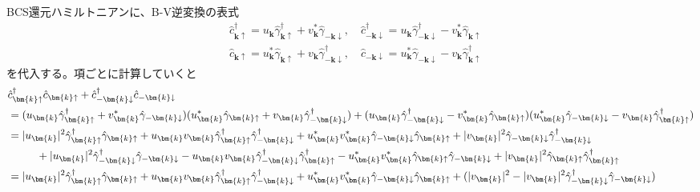 \documentclass[dvipdfmx, 11pt, a4paper]{jsarticle}
\numberwithin{equation}{section}
\theoremstyle{definition}
\begin{document}
    \begin{derivationBox}
        BCS還元ハミルトニアンに、B-V逆変換の表式
        \begin{align}
            &\hat{c}_{\bm{k}\uparrow}^\dagger = u_{\bm{k}} \hat{\gamma}_{\bm{k}\uparrow}^\dagger + v_{\bm{k}}^* \hat{\gamma}_{-\bm{k}\downarrow},\quad \hat{c}_{-\bm{k}\downarrow}^\dagger = u_{\bm{k}}\hat{\gamma}_{-\bm{k}\downarrow}^\dagger - v_{\bm{k}}^* \hat{\gamma}_{\bm{k}\uparrow} \\
            &\hat{c}_{\bm{k}\uparrow} = u_{\bm{k}}^* \hat{\gamma}_{\bm{k}\uparrow} + v_{\bm{k}} \hat{\gamma}_{-\bm{k}\downarrow}^\dagger ,\quad \hat{c}_{-\bm{k}\downarrow} = u_{\bm{k}}^* \hat{\gamma}_{-\bm{k}\downarrow} - v_{\bm{k}}\hat{\gamma}_{\bm{k}\uparrow}^\dagger
        \end{align}
        を代入する。項ごとに計算していくと
        \begin{align}
            &\hat{c}_{\bm{k}\uparrow}^\dagger \hat{c}_{\bm{k}\uparrow} + \hat{c}_{-\bm{k}\downarrow}^\dagger \hat{c}_{-\bm{k}\downarrow}\notag \\
            &= (u_{\bm{k}} \hat{\gamma}_{\bm{k}\uparrow}^\dagger + v_{\bm{k}}^* \hat{\gamma}_{-\bm{k}\downarrow})( u_{\bm{k}}^* \hat{\gamma}_{\bm{k}\uparrow} + v_{\bm{k}} \hat{\gamma}_{-\bm{k}\downarrow}^\dagger) + ( u_{\bm{k}}\hat{\gamma}_{-\bm{k}\downarrow}^\dagger - v_{\bm{k}}^* \hat{\gamma}_{\bm{k}\uparrow})( u_{\bm{k}}^* \hat{\gamma}_{-\bm{k}\downarrow} - v_{\bm{k}}\hat{\gamma}_{\bm{k}\uparrow}^\dagger) \notag \\
            &= |u_{\bm{k}}|^2 \hat{\gamma}_{\bm{k}\uparrow}^\dagger \hat{\gamma}_{\bm{k}\uparrow} +  u_{\bm{k}}v_{\bm{k}} \hat{\gamma}_{\bm{k}\uparrow}^\dagger  \hat{\gamma}_{-\bm{k}\downarrow}^\dagger + u_{\bm{k}}^* v_{\bm{k}}^* \hat{\gamma}_{-\bm{k}\downarrow} \hat{\gamma}_{\bm{k}\uparrow} + |v_{\bm{k}}|^2 \hat{\gamma}_{-\bm{k}\downarrow}\hat{\gamma}_{-\bm{k}\downarrow}^\dagger \notag \\
            &\ \ \ \ \ \ \ \ + |u_{\bm{k}}|^2 \hat{\gamma}_{-\bm{k}\downarrow}^\dagger \hat{\gamma}_{-\bm{k}\downarrow} -  u_{\bm{k}}v_{\bm{k}} \hat{\gamma}_{-\bm{k}\downarrow}^\dagger  \hat{\gamma}_{\bm{k}\uparrow}^\dagger - u_{\bm{k}}^* v_{\bm{k}}^* \hat{\gamma}_{\bm{k}\uparrow} \hat{\gamma}_{-\bm{k}\downarrow} + |v_{\bm{k}}|^2 \hat{\gamma}_{\bm{k}\uparrow}\hat{\gamma}_{\bm{k}\uparrow}^\dagger \notag \\
            &= |u_{\bm{k}}|^2 \hat{\gamma}_{\bm{k}\uparrow}^\dagger \hat{\gamma}_{\bm{k}\uparrow} +  u_{\bm{k}}v_{\bm{k}} \hat{\gamma}_{\bm{k}\uparrow}^\dagger  \hat{\gamma}_{-\bm{k}\downarrow}^\dagger + u_{\bm{k}}^* v_{\bm{k}}^* \hat{\gamma}_{-\bm{k}\downarrow} \hat{\gamma}_{\bm{k}\uparrow}   + (|v_{\bm{k}}|^2 -|v_{\bm{k}}|^2  \hat{\gamma}_{-\bm{k}\downarrow}^\dagger\hat{\gamma}_{-\bm{k}\downarrow}) \notag \\

\end{align}
\end{derivationBox}
\end{document}
